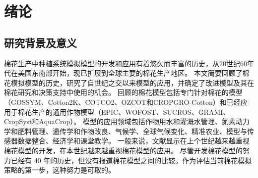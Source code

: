 \chapter{绪论}
\section{研究背景及意义}

棉花生产中种植系统模拟模型的开发和应用有着悠久而丰富的历史，从20世纪60年代在美国东南部开始，现已扩展到全球主要的棉花生产地区。%
本文简要回顾了棉花模拟模型的历史，研究了自世纪之交以来模型的应用，并确定了改进模型及其在棉花研究和决策支持中使用的机会。%
回顾的棉花模型包括专门针对棉花的模型（GOSSYM、Cotton2K、COTCO2、OZCOT和CROPGRO-Cotton）和已经应用于棉花生产的通用作物模型（EPIC、WOFOST、SUCROS、GRAMI、CropSyst和AquaCrop）。%
模型的应用领域包括作物用水和灌溉水管理、氮素动力学和肥料管理、遗传学和作物改良、气候学、全球气候变化、精准农业、模型与传感器数据整合、经济学和课堂教学。%
一般来说，文献显示在上个世纪越来越重视棉花模型的开发，在本世纪越来越重视棉花模型的应用。%
尽管开发棉花模型的努力已经有 40 年的历史，但没有报道棉花模型之间的比较。作为评估当前棉花模拟策略的第一步，这种努力是可取的。%
